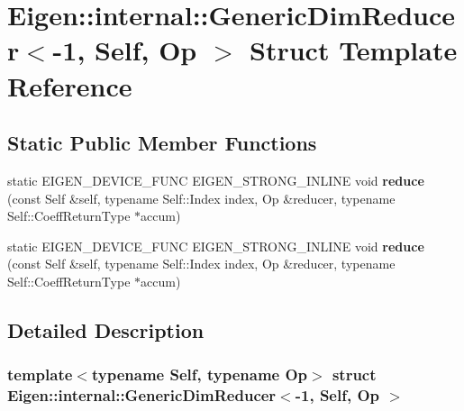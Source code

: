 \hypertarget{struct_eigen_1_1internal_1_1_generic_dim_reducer_3-1_00_01_self_00_01_op_01_4}{}\section{Eigen\+:\+:internal\+:\+:Generic\+Dim\+Reducer$<$-\/1, Self, Op $>$ Struct Template Reference}
\label{struct_eigen_1_1internal_1_1_generic_dim_reducer_3-1_00_01_self_00_01_op_01_4}
\subsection*{Static Public Member Functions}
\begin{DoxyCompactItemize}
\item 
\mbox{\label{struct_eigen_1_1internal_1_1_generic_dim_reducer_3-1_00_01_self_00_01_op_01_4_acaf76ffc480ed4e8c7d6a2dd221491a5}} 
static E\+I\+G\+E\+N\+\_\+\+D\+E\+V\+I\+C\+E\+\_\+\+F\+U\+NC E\+I\+G\+E\+N\+\_\+\+S\+T\+R\+O\+N\+G\+\_\+\+I\+N\+L\+I\+NE void {\bfseries reduce} (const Self \&self, typename Self\+::\+Index index, Op \&reducer, typename Self\+::\+Coeff\+Return\+Type $\ast$accum)
\item 
\mbox{\label{struct_eigen_1_1internal_1_1_generic_dim_reducer_3-1_00_01_self_00_01_op_01_4_acaf76ffc480ed4e8c7d6a2dd221491a5}} 
static E\+I\+G\+E\+N\+\_\+\+D\+E\+V\+I\+C\+E\+\_\+\+F\+U\+NC E\+I\+G\+E\+N\+\_\+\+S\+T\+R\+O\+N\+G\+\_\+\+I\+N\+L\+I\+NE void {\bfseries reduce} (const Self \&self, typename Self\+::\+Index index, Op \&reducer, typename Self\+::\+Coeff\+Return\+Type $\ast$accum)
\end{DoxyCompactItemize}


\subsection{Detailed Description}
\subsubsection*{template$<$typename Self, typename Op$>$\newline
struct Eigen\+::internal\+::\+Generic\+Dim\+Reducer$<$-\/1, Self, Op $>$}




